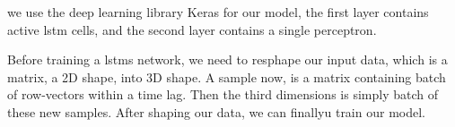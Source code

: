we use the deep learning library Keras for our model, the first layer contains active \ac{lstm} cells, and the second layer contains a single perceptron.

Before training a \acp{lstm} network, we need to resphape our input data, which is a matrix, a 2D shape, into 3D shape. A sample now, is a matrix containing batch of row-vectors within a time lag. Then the third dimensions is simply batch of these new samples. After shaping our data, we can finallyu train our model.


